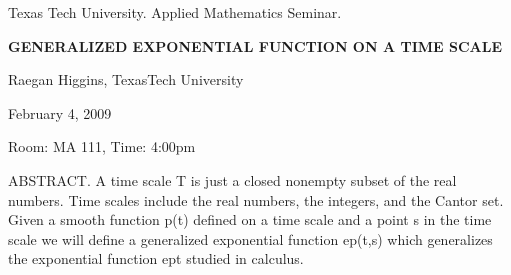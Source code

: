 \documentclass[oneside]{amsart}
\begin{document}
\begin{center}
Texas Tech University. Applied Mathematics Seminar.

\end{center}

\begin{center}

{\LARGE \uppercase{\textbf{
Generalized Exponential Function on a Time Scale
}}}

Raegan Higgins, TexasTech University

February 4, 2009

Room: MA 111, Time: 4:00pm

\end{center}

ABSTRACT.  A time scale T is just a closed nonempty subset of the real numbers. Time scales include the real numbers, the integers, and the Cantor set. Given a smooth function p(t) defined on a time scale and a point s in the time scale we will define a generalized exponential function ep(t,s) which generalizes the exponential function ept studied in calculus.
\end{document}
